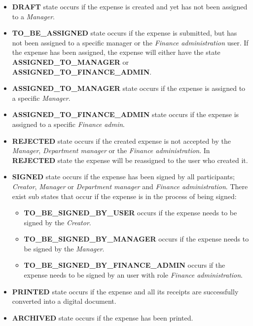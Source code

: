 \begin{itemize}
    \item \textbf{DRAFT} state occurs if the expense is created and yet has not been assigned to a \textit{Manager}.

    \item \textbf{TO\_BE\_ASSIGNED} state occurs if the expense is submitted, but has not been assigned to a specific manager or the \textit{Finance administration} user. If the expense has been assigned, the expense will either have the state \textbf{ASSIGNED\_TO\_MANAGER} or \textbf{ASSIGNED\_TO\_FINANCE\_ADMIN}.

    \item \textbf{ASSIGNED\_TO\_MANAGER} state occurs if the expense is assigned to a specific \textit{Manager}.

    \item \textbf{ASSIGNED\_TO\_FINANCE\_ADMIN} state occurs if the expense is assigned to a specific \textit{Finance admin}.

    \item \textbf{REJECTED} state occurs if the created expense is not accepted by the \textit{Manager}, \textit{Department manager} or the \textit{Finance administration}. In \textbf{REJECTED} state the expense will be reassigned to the user who created it.

    \item \textbf{SIGNED} state occurs if the expense has been signed by all participants; \textit{Creator}, \textit{Manager} or \textit{Department manager} and \textit{Finance administration}. There exist sub states that occur if the expense is in the process of being signed:
        \begin{itemize}
            \item \textbf{TO\_BE\_SIGNED\_BY\_USER} occurs if the expense needs to be signed by the \textit{Creator}.
            \item \textbf{TO\_BE\_SIGNED\_BY\_MANAGER} occurs if the expense needs to be signed by the \textit{Manager}.
            \item \textbf{TO\_BE\_SIGNED\_BY\_FINANCE\_ADMIN} occurs if the expense needs to be signed by an user with role \textit{Finance administration}.
        \end{itemize}

    \item \textbf{PRINTED} state occurs if the expense and all its receipts are successfully converted into a digital document.

    \item \textbf{ARCHIVED} state occurs if the expense has been printed.
\end{itemize}

